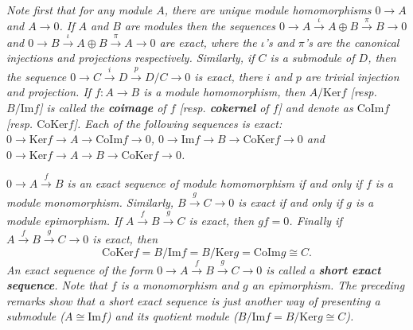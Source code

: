 \begin{example}\em
Note first that for any module $A$, there are unique module homomorphisms $0\longrightarrow A$ and $A\longrightarrow 0$. If $A$ and $B$ are modules then the sequences $0\longrightarrow A\overset{\iota}{\longrightarrow}A\oplus B\overset{\pi}{\longrightarrow}B\longrightarrow 0$ and $0\longrightarrow B\overset{\iota}{\longrightarrow}A\oplus B\overset{\pi}{\longrightarrow}A\longrightarrow 0$ are exact, where the $\iota$'s and $\pi$'s are the canonical injections and projections respectively. Similarly, if $C$ is a submodule of $D$, then the sequence $0\longrightarrow C\overset{i}{\longrightarrow}D\overset{p}{\longrightarrow}D/C\longrightarrow 0$ is exact, there $i$ and $p$ are trivial injection and projection. If $f:A\to B$ is a module homomorphism, then $A/\mathrm{Ker}f$ [resp. $B/\mathrm{Im}f$] is called the \textbf{coimage} of $f$ [resp. \textbf{cokernel} of $f$] and denote as $\mathrm{CoIm}f$ [resp. $\mathrm{CoKer}f$]. Each of the following sequences is exact: $0\longrightarrow \mathrm{Ker}f\longrightarrow A\longrightarrow \mathrm{CoIm}f\longrightarrow 0$, $0\longrightarrow \mathrm{Im}f\longrightarrow B\longrightarrow \mathrm{CoKer}f\longrightarrow 0$ and $0\longrightarrow \mathrm{Ker}f\longrightarrow A\longrightarrow B\longrightarrow \mathrm{CoKer}f\longrightarrow 0$.
\end{example}
\begin{note}\em
$0\longrightarrow A\overset{f}{\longrightarrow}B$ is an exact sequence of module homomorphism if and only if $f$ is a module monomorphism. Similarly, $B\overset{g}{\longrightarrow}C\longrightarrow 0$ is exact if and only if $g$ is a module epimorphism. If $A\overset{f}{\longrightarrow}B\overset{g}{\longrightarrow}C$ is exact, then $gf=0$. Finally if $A\overset{f}{\longrightarrow}B\overset{g}{\longrightarrow}C\longrightarrow 0$ is exact, then 
$$
\mathrm{CoKer}f=B/\mathrm{Im}f=B/\mathrm{Ker}g=\mathrm{CoIm}g\cong C.
$$
An exact sequence of the form $0\longrightarrow A\overset{f}{\longrightarrow}B\overset{g}{\longrightarrow}C\longrightarrow 0$ is called a \textbf{short exact sequence}. Note that $f$ is a monomorphism and $g$ an epimorphism. The preceding remarks show that a short exact sequence is just another way of presenting a submodule ($A\cong\mathrm{Im}f$) and its quotient module ($B/\mathrm{Im}f=B/\mathrm{Ker}g\cong C$).
\end{note}
